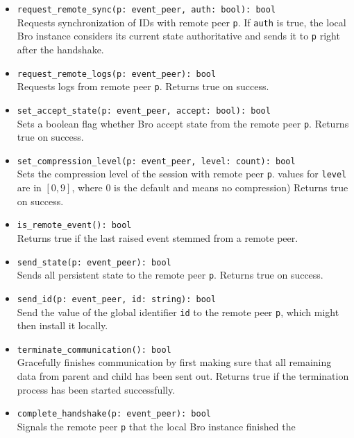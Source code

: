 \documentclass[10pt,landscape]{article}
\newcommand{\ReturnsTrueOnSuccess}{Returns true on success.\xspace}
\begin{document}
\begin{multicols*}{2}
{\begin{itemize}
    Subscribes to all events from remote peer \verb|p| whose names match the
    pattern \verb|handlers|.
  \item \verb|request_remote_sync(p: event_peer, auth: bool): bool|\\
    Requests synchronization of IDs with remote peer \verb|p|. If \verb|auth|
    is true, the local Bro instance considers its current state authoritative
    and sends it to \verb|p| right after the handshake.
  \item \verb|request_remote_logs(p: event_peer): bool|\\
    Requests logs from remote peer \verb|p|.
    \ReturnsTrueOnSuccess
  \item \verb|set_accept_state(p: event_peer, accept: bool): bool|\\
    Sets a boolean flag whether Bro accept state from the remote peer \verb|p|.
    \ReturnsTrueOnSuccess
  \item \verb|set_compression_level(p: event_peer, level: count): bool|\\
    Sets the compression level of the session with remote peer \verb|p|.
    values for \verb|level| are in $[0,9]$, where 0 is the default and means no
    compression)
    \ReturnsTrueOnSuccess
  \item \verb|is_remote_event(): bool|\\
    Returns true if the last raised event stemmed from a remote peer.
  \item \verb|send_state(p: event_peer): bool|\\
    Sends all persistent state to the remote peer \verb|p|.
    \ReturnsTrueOnSuccess
  \item \verb|send_id(p: event_peer, id: string): bool|\\
    Send the value of the global identifier \verb|id| to the remote peer
    \verb|p|, which might then install it locally.
  \item \verb|terminate_communication(): bool|\\
    Gracefully finishes communication by first making sure that all remaining
    data from parent and child has been sent out.
    Returns true if the termination process has been started successfully.
  \item \verb|complete_handshake(p: event_peer): bool|\\
    Signals the remote peer \verb|p| that the local Bro instance finished the

\end{itemize}}
\end{multicols*}
\end{document}
